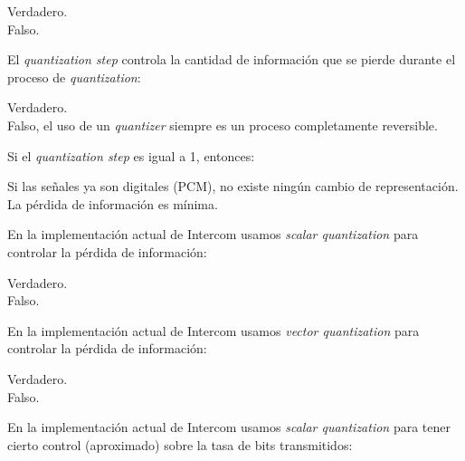 \documentclass[legalpaper, 12pt, addpoints]{exam}
\begin{document}
\begin{questions}
\begin{oneparchoices}
  \choice Verdadero.\\
  \choice Falso.
\end{oneparchoices}
  
\vspace{0.10in}

\question El \emph{quantization step} controla la cantidad de
información que se pierde durante el proceso de \emph{quantization}:

\begin{oneparchoices}
  \choice Verdadero.\\
  \choice Falso, el uso de un \emph{quantizer} siempre es un proceso completamente reversible.
\end{oneparchoices}
  
\vspace{0.10in}

\question Si el \emph{quantization step} es igual a 1, entonces:

\begin{oneparchoices}
  \choice Si las señales ya son digitales (PCM), no existe ningún cambio de representación.\\
  \choice La pérdida de información es mínima.
\end{oneparchoices}
  
\vspace{0.10in}

\question En la implementación actual de Intercom usamos \emph{scalar
quantization} para controlar la pérdida de información:

\begin{oneparchoices}
  \choice Verdadero.\\
  \choice Falso.
\end{oneparchoices}
  
\vspace{0.10in}

\question En la implementación actual de Intercom usamos \emph{vector
quantization} para controlar la pérdida de información:

\begin{oneparchoices}
  \choice Verdadero.\\
  \choice Falso.
\end{oneparchoices}
  
\vspace{0.10in}

\question En la implementación actual de Intercom usamos \emph{scalar
  quantization} para tener cierto control (aproximado) sobre la tasa
de bits transmitidos:


\end{questions}
\end{document}
